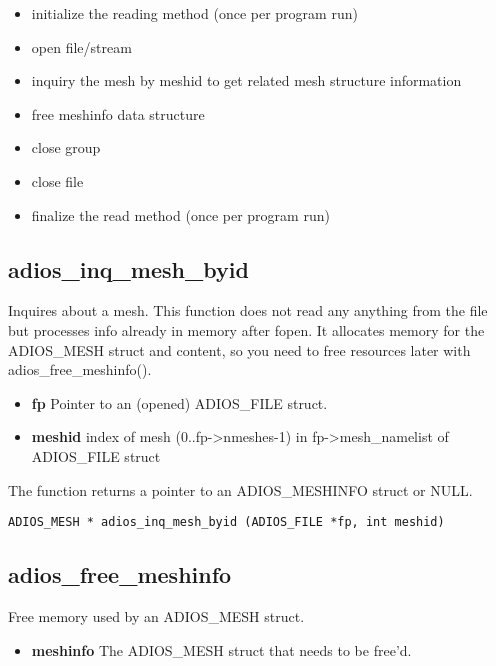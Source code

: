 \begin{itemize}
\renewcommand{\labelitemi}{$-$}
\item initialize the reading method (once per program run)

\item open file/stream

\item inquiry the mesh by meshid to get related mesh structure information

\item free meshinfo data structure

\item close group

\item close file

\item finalize the read method (once per program run)
\end{itemize}

\subsection{adios\_inq\_mesh\_byid}

\noindent Inquires about a mesh. This function does not read any anything from the file but processes info already in memory after fopen. It allocates memory for the ADIOS\_MESH struct and content, so you need to free resources later with adios\_free\_meshinfo().

\begin{itemize}
\item{\bf fp} Pointer to an (opened) ADIOS\_FILE struct.
\item{\bf meshid}    index of mesh (0..fp->nmeshes-1)
in fp->mesh\_namelist of ADIOS\_FILE struct
\end{itemize}

\noindent The function returns a pointer to an ADIOS\_MESHINFO struct or NULL.

\begin{lstlisting}
ADIOS_MESH * adios_inq_mesh_byid (ADIOS_FILE *fp, int meshid)
\end{lstlisting}

\subsection{adios\_free\_meshinfo}

\noindent Free memory used by an ADIOS\_MESH struct.

\begin{itemize}
\item{\bf meshinfo} The ADIOS\_MESH struct that needs to be free'd.
\end{itemize}

